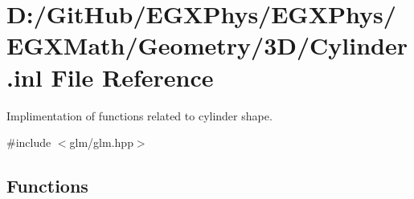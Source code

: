 \hypertarget{_cylinder_8inl}{}\section{D\+:/\+Git\+Hub/\+E\+G\+X\+Phys/\+E\+G\+X\+Phys/\+E\+G\+X\+Math/\+Geometry/3\+D/\+Cylinder.inl File Reference}
\label{_cylinder_8inl}


Implimentation of functions related to cylinder shape.  


{\ttfamily \#include $<$glm/glm.\+hpp$>$}\newline
\subsection*{Functions}
